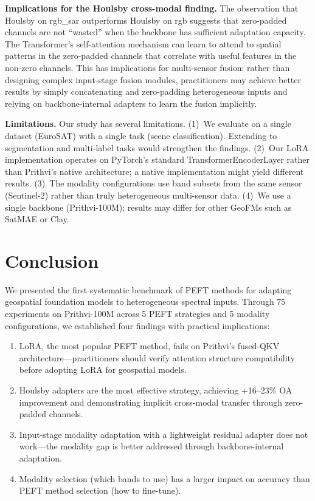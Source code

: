 \documentclass{article}
\begin{document}
\textbf{Implications for the Houlsby cross-modal finding.} The observation that Houlsby on rgb\_sar outperforms Houlsby on rgb suggests that zero-padded channels are not ``wasted'' when the backbone has sufficient adaptation capacity. The Transformer's self-attention mechanism can learn to attend to spatial patterns in the zero-padded channels that correlate with useful features in the non-zero channels. This has implications for multi-sensor fusion: rather than designing complex input-stage fusion modules, practitioners may achieve better results by simply concatenating and zero-padding heterogeneous inputs and relying on backbone-internal adapters to learn the fusion implicitly.

\textbf{Limitations.} Our study has several limitations. (1)~We evaluate on a single dataset (EuroSAT) with a single task (scene classification). Extending to segmentation and multi-label tasks would strengthen the findings. (2)~Our LoRA implementation operates on PyTorch's standard TransformerEncoderLayer rather than Prithvi's native architecture; a native implementation might yield different results. (3)~The modality configurations use band subsets from the same sensor (Sentinel-2) rather than truly heterogeneous multi-sensor data. (4)~We use a single backbone (Prithvi-100M); results may differ for other GeoFMs such as SatMAE or Clay.

\section{Conclusion}
\label{sec:conclusion}

We presented the first systematic benchmark of PEFT methods for adapting geospatial foundation models to heterogeneous spectral inputs. Through 75 experiments on Prithvi-100M across 5 PEFT strategies and 5 modality configurations, we established four findings with practical implications:

\begin{enumerate}
\item LoRA, the most popular PEFT method, fails on Prithvi's fused-QKV architecture---practitioners should verify attention structure compatibility before adopting LoRA for geospatial models.
\item Houlsby adapters are the most effective strategy, achieving +16--23\% OA improvement and demonstrating implicit cross-modal transfer through zero-padded channels.
\item Input-stage modality adaptation with a lightweight residual adapter does not work---the modality gap is better addressed through backbone-internal adaptation.
\item Modality selection (which bands to use) has a larger impact on accuracy than PEFT method selection (how to fine-tune).
\end{enumerate}
\end{document}
